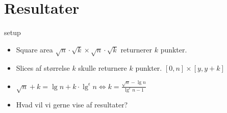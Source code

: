 \documentclass[pdf]{beamer}
\begin{document}
\section{Resultater}

\begin{frame}{setup}
  \begin{itemize}
    \item Square area $\sqrt{n}\cdot\sqrt{k}\times\sqrt{n}\cdot\sqrt{k}$ returnerer $k$ punkter.
    \item Slices af størrelse $k$ skulle returnere $k$ punkter. $[0,n] \times [y, y+k]$
    \item $\sqrt{n}+k = \lg n + k\cdot\lg^\epsilon n \Leftrightarrow k = \frac{\sqrt{n}-\lg n}{\lg^\epsilon n -1}$
  \end{itemize}
\end{frame}

\begin{frame}
  \begin{itemize}
    \item Hvad vil vi gerne vise af resultater?
  \end{itemize}
\end{frame}
\end{document}
